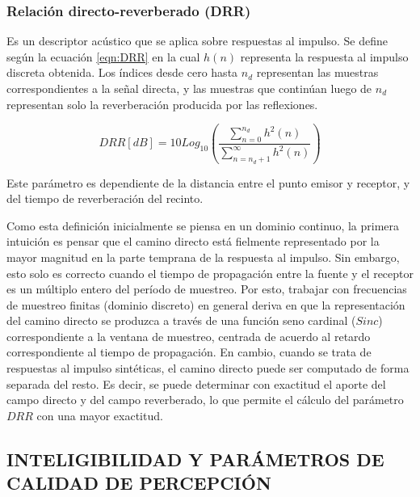 \subsubsection{Relación directo-reverberado (DRR)}

Es un descriptor acústico que se aplica sobre respuestas al impulso. Se define según la ecuación \ref{eqn:DRR} en la cual $h(n)$ representa la respuesta al impulso discreta obtenida. Los índices desde cero hasta $n_{d}$ representan las muestras correspondientes a la señal directa, y las muestras que continúan luego de $n_{d}$ representan solo la reverberación producida por las reflexiones. 

\begin{equation}
\label{eqn:DRR}
	DRR  [dB]= 10 Log_{10}(\frac{\sum_{n=0}^{n_d}h^{2}(n)}{\sum_{n=n_{d}+1}^{\infty}h^{2}(n)}) 
\end{equation}

Este parámetro es dependiente de la distancia entre el punto emisor y receptor, y del tiempo de reverberación del recinto.

Como esta definición inicialmente se piensa en un dominio continuo, la primera intuición es pensar que el camino directo está fielmente representado por la mayor magnitud en la parte temprana de la respuesta al impulso. Sin embargo, esto solo es correcto cuando el tiempo de propagación entre la fuente y el receptor es un múltiplo entero del período de muestreo. Por esto, trabajar con frecuencias de muestreo finitas (dominio discreto) en general deriva en que la representación del camino directo se produzca a través de una función seno cardinal ($Sinc$) correspondiente a la ventana de muestreo, centrada de acuerdo al retardo correspondiente al tiempo de propagación. En cambio, cuando se trata de respuestas al impulso sintéticas, el camino directo puede ser computado de forma separada del resto. Es decir, se puede determinar con exactitud el aporte del campo directo y del campo reverberado, lo que permite el cálculo del parámetro $DRR$ con una mayor exactitud. 




\subsection[Inteligibilidad y parámetros de calidad de percepción]{INTELIGIBILIDAD Y PARÁMETROS DE CALIDAD DE PERCEPCIÓN}

